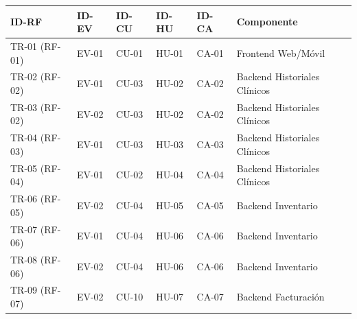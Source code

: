 \documentclass[
]{article}
\newcounter{none} %
\begin{document}
{\def\LTcaptype{none} %
\begin{longtable}[]{|
  >{\centering\arraybackslash}p{}|
  >{\centering\arraybackslash}p{}|
  >{\centering\arraybackslash}p{}|
  >{\centering\arraybackslash}p{}|
  >{\centering\arraybackslash}p{}|
  >{\raggedright\arraybackslash}p{}|}
\hline
\begin{minipage}[b]{\linewidth}\centering
\textbf{ID-RF}
\end{minipage} & \begin{minipage}[b]{\linewidth}\centering
\textbf{ID-EV}
\end{minipage} & \begin{minipage}[b]{\linewidth}\centering
\textbf{ID-CU}
\end{minipage} & \begin{minipage}[b]{\linewidth}\centering
\textbf{ID-HU}
\end{minipage} & \begin{minipage}[b]{\linewidth}\centering
\textbf{ID-CA}
\end{minipage} & \begin{minipage}[b]{\linewidth}\raggedright
\textbf{Componente}
\end{minipage} \\
\hline
\endhead
\hline
\endlastfoot
TR-01 (RF-01) & EV-01 & CU-01 & HU-01 & CA-01 & Frontend Web/Móvil \\
\hline
TR-02 (RF-02) & EV-01 & CU-03 & HU-02 & CA-02 & Backend Historiales Clínicos \\
\hline
TR-03 (RF-02) & EV-02 & CU-03 & HU-02 & CA-02 & Backend Historiales Clínicos \\
\hline
TR-04 (RF-03) & EV-01 & CU-03 & HU-03 & CA-03 & Backend Historiales Clínicos \\
\hline
TR-05 (RF-04) & EV-01 & CU-02 & HU-04 & CA-04 & Backend Historiales Clínicos \\
\hline
TR-06 (RF-05) & EV-02 & CU-04 & HU-05 & CA-05 & Backend Inventario \\
\hline
TR-07 (RF-06) & EV-01 & CU-04 & HU-06 & CA-06 & Backend Inventario \\
\hline
TR-08 (RF-06) & EV-02 & CU-04 & HU-06 & CA-06 & Backend Inventario \\
\hline
TR-09 (RF-07) & EV-02 & CU-10 & HU-07 & CA-07 & Backend Facturación \\

\end{longtable}}
\end{document}
